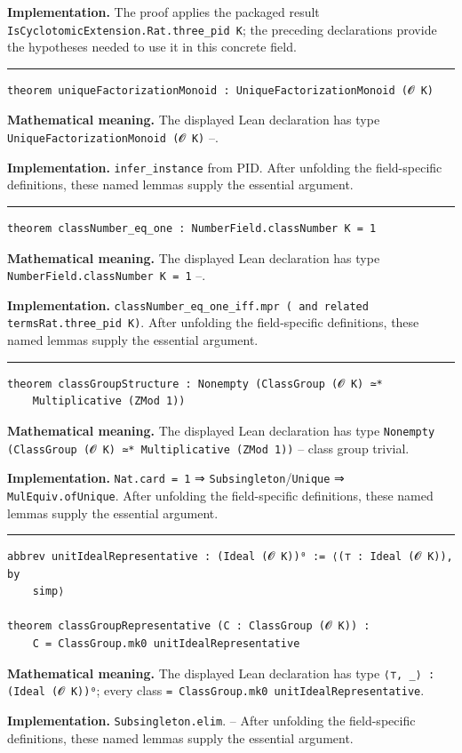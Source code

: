 \documentclass[UTF8,a4paper,11pt,fontset=fandol]{ctexart}
\theoremstyle{definition}
\newcommand{\statementsep}{\par\medskip\hrule\medskip}
\begin{document}
\noindent\textbf{Implementation.} The proof applies the packaged result \texttt{IsCyclotomicExtension.\allowbreak{}Rat.\allowbreak{}three\_\allowbreak{}pid K}; the preceding declarations provide the hypotheses needed to use it in this concrete field.\par
\statementsep
\begin{verbatim}
theorem uniqueFactorizationMonoid : UniqueFactorizationMonoid (𝓞 K)
\end{verbatim}
\noindent\textbf{Mathematical meaning.} The displayed Lean declaration has type \texttt{UniqueFactorizationMonoid (𝓞 K)} --.\par
\noindent\textbf{Implementation.} \texttt{infer\_\allowbreak{}instance} from PID. After unfolding the field-specific definitions, these named lemmas supply the essential argument.\par
\statementsep
\begin{verbatim}
theorem classNumber_eq_one : NumberField.classNumber K = 1
\end{verbatim}
\noindent\textbf{Mathematical meaning.} The displayed Lean declaration has type \texttt{NumberField.\allowbreak{}classNumber K = 1} --.\par
\noindent\textbf{Implementation.} \texttt{classNumber\_\allowbreak{}eq\_\allowbreak{}one\_\allowbreak{}iff.\allowbreak{}mpr ( and related termsRat.\allowbreak{}three\_\allowbreak{}pid K)}. After unfolding the field-specific definitions, these named lemmas supply the essential argument.\par
\statementsep
\begin{verbatim}
theorem classGroupStructure : Nonempty (ClassGroup (𝓞 K) ≃*
    Multiplicative (ZMod 1))
\end{verbatim}
\noindent\textbf{Mathematical meaning.} The displayed Lean declaration has type \texttt{Nonempty (ClassGroup (𝓞 K) ≃* Multiplicative (ZMod 1))} -- class group trivial.\par
\noindent\textbf{Implementation.} \texttt{Nat.\allowbreak{}card = 1} ⇒ \texttt{Subsingleton}/\texttt{Unique} ⇒ \texttt{MulEquiv.\allowbreak{}ofUnique}. After unfolding the field-specific definitions, these named lemmas supply the essential argument.\par
\statementsep
\begin{verbatim}
abbrev unitIdealRepresentative : (Ideal (𝓞 K))⁰ := ⟨(⊤ : Ideal (𝓞 K)), by
    simp⟩

theorem classGroupRepresentative (C : ClassGroup (𝓞 K)) :
    C = ClassGroup.mk0 unitIdealRepresentative
\end{verbatim}
\noindent\textbf{Mathematical meaning.} The displayed Lean declaration has type \texttt{⟨⊤, \_\allowbreak{}⟩ : (Ideal (𝓞 K))⁰}; every class \texttt{= ClassGroup.\allowbreak{}mk0 unitIdealRepresentative}.\par
\noindent\textbf{Implementation.} \texttt{Subsingleton.\allowbreak{}elim}. -- After unfolding the field-specific definitions, these named lemmas supply the essential argument.\par
\end{document}
